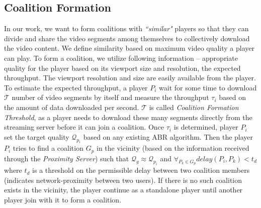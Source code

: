 
\subsection{Coalition Formation}
In our work, we want to form coalitions with \textit{``similar"} players so that they can divide and share the video segments among themselves to collectively download the video content. We define similarity based on maximum video quality a player can play. To form a coalition, we utilize following information -- appropriate quality for the player based on its viewport size and resolution, the expected throughput. The viewport resolution and size are easily available from the player. To estimate the expected throughput, a player $P_i$ wait for some time to download $\mathcal{T}$ number of video segments by itself and measure the throughput $\tau_i$ based on the amount of data downloaded per second. $\mathcal{T}$ is called \textit{Coalition Formation Threshold}, as a player needs to download these many segments directly from the streaming server before it can join a coalition. Once $\tau_i$ is determined, player $P_i$ set the target quality $\mathcal{Q}_{p_i}$ based on any existing ABR algorithm. Then the player $P_i$ tries to find a coalition $G_p$ in the vicinity (based on the information received through the \textit{Proximity Server}) such that $\mathcal{Q}_g \approx \mathcal{Q}_{p_i}$ and $\forall_{P_k \in G_p} delay(P_i, P_k) < t_d$ where $t_d$ is a threshold on the permissible delay between two coalition members (indicates network-proximity between two users). If there is no such coalition exists in the vicinity, the player continue as a standalone player until another player join with it to form a coalition.
%

